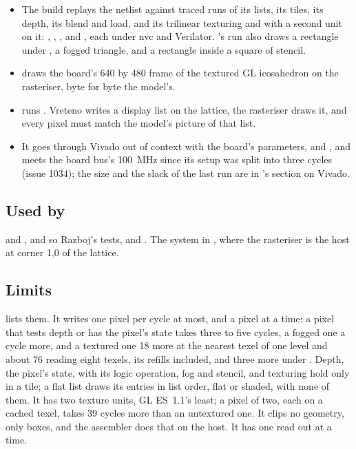 \begin{itemize}
\begin{itemize}
\end{itemize}
 and
 measure what those cost,
the first with two units too: more than twice one unit's hit and less
than four cycles over it.
\item The build replays the netlist against traced runs of its lists,
its tiles, its depth, its blend and load, and its trilinear texturing
and  with a second unit on it:
, ,
,  and , each
under nvc and Verilator. 's run also draws a
rectangle under , a fogged triangle, and a rectangle
inside a square of stencil.
\item {} draws the board's 640 by
480 frame of the textured GL icosahedron on the rasteriser, byte for
byte the model's.
\item {} runs
. Vreteno writes
a display list on the lattice, the rasteriser draws it, and every pixel
must match the model's picture of that list.
\item It goes through Vivado out of context with the board's
parameters,  and
, and meets the board bus's 100~MHz
since its setup was split into three cycles (issue 1034); the size and
the slack of the last run are in 's section on
Vivado.
\end{itemize}

\subsection*{Used by}

 and , and so Razboj's
tests,  and . The system in
, where the rasteriser is the host at corner 1,0 of the
lattice.

\subsection*{Limits}

 lists them. It writes one pixel per cycle at most,
and a pixel at a time: a pixel that tests depth or has the pixel's
state takes three to five cycles, a fogged one a cycle more, and a
textured one 18 more at the nearest texel of one level and about 76
reading eight texels, its refills included, and three more under
. Depth, the pixel's state,
with its logic operation, fog and stencil, and texturing hold only in a
tile; a flat list draws its entries in list order, flat or shaded,
with none of them. It has two texture units, GL ES~1.1's least; a
pixel of two, each on a cached texel, takes 39 cycles more than an
untextured one. It
clips no geometry, only boxes, and the assembler  does
that on the host. It has one read out at a time.

